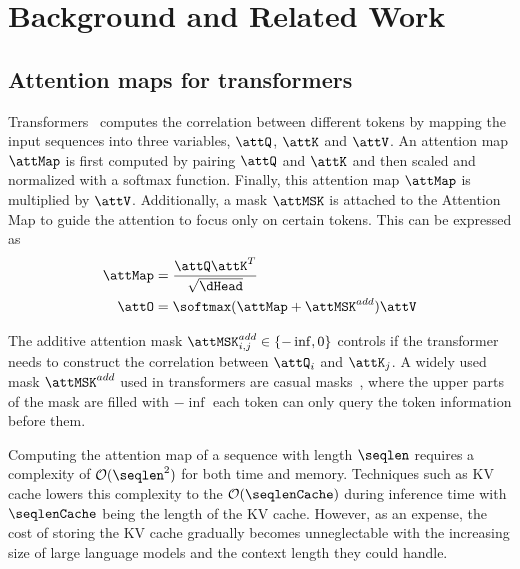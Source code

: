 \section{Background and Related Work}
\subsection{Attention maps for transformers~\label{sec:attmap}}
Transformers~\citep{vaswani-neurips17a} computes the correlation between different tokens by mapping the input sequences into three variables, $\attQ$, $\attK$ and $\attV$. An attention map $\attMap$ is first computed by pairing $\attQ$ and $\attK$ and then scaled and normalized with a softmax function. Finally, this attention map $\attMap$ is multiplied by $\attV$. Additionally, a mask $\attMSK$ is attached to the Attention Map to guide the attention to focus only on certain tokens. This can be expressed as 
\begin{align}
    \attMap & = \frac{\attQ\attK^T}{\sqrt{\dHead}}\label{eq:attmap}\\
    \attO & = \softmax(\attMap  + \attMSK^{add})\attV\label{eq:attout}
\end{align}

The additive attention mask $\attMSK^{add}_{i,j} \in \{ -\inf, 0 \}$ controls if the transformer needs to construct the correlation between $\attQ_i$ and $\attK_{j}$.  A widely used mask $\attMSK^{add}$ used in transformers are casual masks~\citep{vaswani-neurips17a}, where the upper parts of the mask are filled with $-\inf$ each token can only query the token information before them. 

Computing the attention map of a sequence with length $\seqlen$ requires a complexity of $\mathcal{O}(\seqlen^2)$ for both time and memory. Techniques such as KV cache lowers this complexity to the $\mathcal{O}(\seqlenCache)$ during inference time with  $\seqlenCache$ being the length of the KV cache. However, as an expense, the cost of storing the KV cache gradually becomes unneglectable with the increasing size of large language models and the context length they could handle. 

